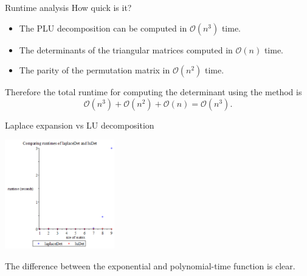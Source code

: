 \documentclass{beamer}
\begin{document}
\begin{frame}{Runtime analysis}
    How quick is it?
    \begin{itemize}
        \item The PLU decomposition can be computed in $\mathcal{O}(n^3)$ time.
        \item The determinants of the triangular matrices computed in $\mathcal{O}(n)$ time.
        \item The parity of the permutation matrix in $\mathcal{O}(n^2)$ time.
    \end{itemize}

    Therefore the total runtime for computing the determinant using the method is
    \[
        \mathcal{O}(n^3) + \mathcal{O}(n^2) + \mathcal{O}(n) = \mathcal{O}(n^3).
    \]

\end{frame}


\begin{frame}{Laplace expansion vs LU decomposition}

    \begin{center}{}
        \includegraphics[height=180]{laplace-lu}
    \end{center}

    The difference between the exponential and polynomial-time function is clear.
\end{frame}
\end{document}
